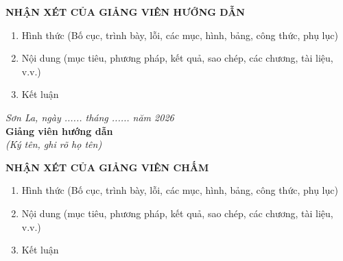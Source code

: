 \documentclass[13pt,a4paper]{extarticle}
\numberwithin{figure}{section}
\numberwithin{table}{section}
\begin{document}
	\newpage
	\begin{center}
		\fontsize{14pt}{20pt}\selectfont
		\textbf{NHẬN XÉT CỦA GIẢNG VIÊN HƯỚNG DẪN}
	\end{center}
	
	\vspace{1cm}
	
	\begin{enumerate}
		\item Hình thức (Bố cục, trình bày, lỗi, các mục, hình, bảng, công thức, phụ lục)
		
		\vspace{3cm}
		
		\item Nội dung (mục tiêu, phương pháp, kết quả, sao chép, các chương, tài liệu, v.v.)
		
		\vspace{3cm}
		
		\item Kết luận
		
		\vspace{3cm}
	\end{enumerate}
	
	\vspace{1cm}
	
	\begin{flushright}
		\textit{Sơn La, ngày ...... tháng ...... năm 2026}\\[0.5cm]
		\textbf{Giảng viên hướng dẫn}\\[0.3cm]
		\textit{(Ký tên, ghi rõ họ tên)}
	\end{flushright}
	
	\newpage
	\begin{center}
		\fontsize{14pt}{20pt}\selectfont
		\textbf{NHẬN XÉT CỦA GIẢNG VIÊN CHẤM}
	\end{center}
	
	\vspace{1cm}
	
	\begin{enumerate}
		\item Hình thức (Bố cục, trình bày, lỗi, các mục, hình, bảng, công thức, phụ lục)
		
		\vspace{3cm}
		
		\item Nội dung (mục tiêu, phương pháp, kết quả, sao chép, các chương, tài liệu, v.v.)
		
		\vspace{3cm}
		
		\item Kết luận
		
		\vspace{3cm}
	\end{enumerate}
	
\end{document}

